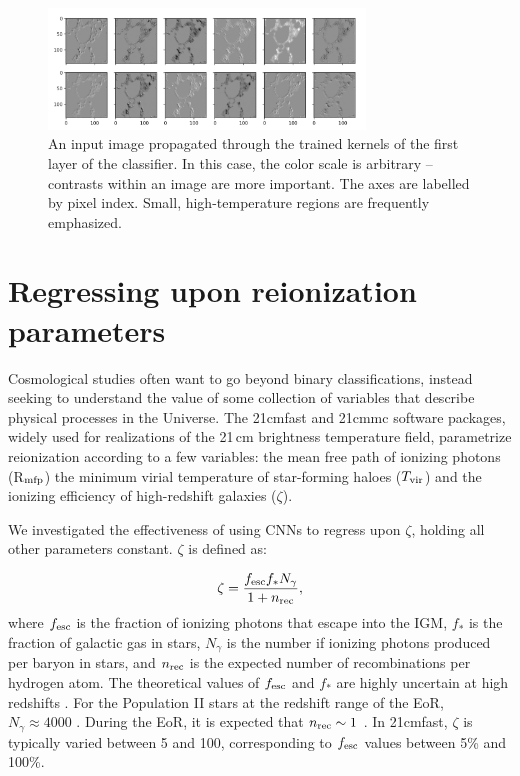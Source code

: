 \begin{figure}
\centering
\includegraphics[width=0.75\textwidth]{chapters/hera_ml/figures/classifier-kernels.png}
\caption[An input image propagated through the trained kernels of the first layer of the classifier.]{An input image propagated through the trained kernels of the first layer of the classifier. In this case, the color scale is arbitrary -- contrasts within an image are more important. The axes are labelled by pixel index. Small, high-temperature regions are frequently emphasized.}
\label{fig:CNN_kernel_images}
\end{figure}

\section{Regressing upon reionization parameters}

Cosmological studies often want to go beyond binary classifications, instead seeking to understand the value of some collection of variables that describe physical processes in the Universe. 
The {\sc 21cmfast} \citep{Mesinger.11} and {\sc 21cmmc} \citep{Greig.15} software packages, widely used for realizations of the 21\,cm brightness temperature field, parametrize reionization according to a few variables: the mean free path of ionizing photons (R$_{\rm mfp}$) the minimum virial temperature of star-forming haloes ($T_{\rm vir}$) and the ionizing efficiency of high-redshift galaxies ($\zeta$). 

We investigated the effectiveness of using CNNs to regress upon $\zeta$, holding all other parameters constant. $\zeta$ is defined as:

\begin{equation}
\zeta =  \frac{f_{\rm esc} f_* N_{\gamma}}{1+n_{\rm rec}},
\end{equation}
where $f_{\rm esc}$ is the fraction of ionizing photons that escape into the IGM, $f_*$ is the fraction of galactic gas in stars, $N_{\gamma}$ is the number if ionizing photons produced per baryon in stars, and $n_{\rm rec}$ is the expected number of recombinations per hydrogen atom. The theoretical values of $f_{\rm esc}$ and $f_*$ are highly uncertain at high redshifts \citep[e.g.][]{Paardekooper.15, Meiksin.17}. For the Population II stars at the redshift range of the EoR, $N_{\gamma}\approx4000$ \citep{Barkana.05}. During the EoR, it is expected that $n_{\rm rec}\sim 1$ \citep[e.g.][]{McQuinn.11, Sobacchi.14}. In {\sc 21cmfast}, $\zeta$ is typically varied between 5 and 100, corresponding to $f_{\rm esc}$ values between 5\% and 100\%.

